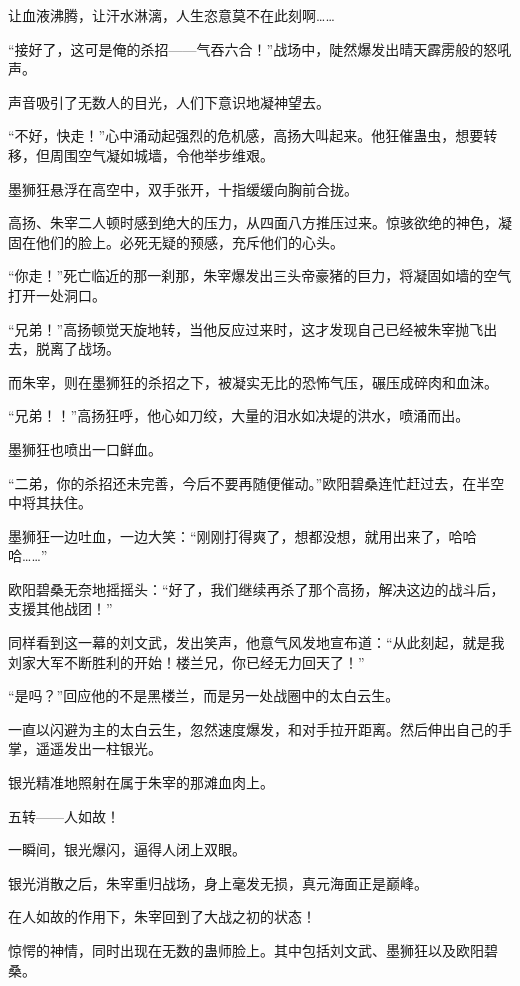 \begin{this_body}
让血液沸腾，让汗水淋漓，人生恣意莫不在此刻啊……

“接好了，这可是俺的杀招——气吞六合！”战场中，陡然爆发出晴天霹雳般的怒吼声。

声音吸引了无数人的目光，人们下意识地凝神望去。

“不好，快走！”心中涌动起强烈的危机感，高扬大叫起来。他狂催蛊虫，想要转移，但周围空气凝如城墙，令他举步维艰。

墨狮狂悬浮在高空中，双手张开，十指缓缓向胸前合拢。

高扬、朱宰二人顿时感到绝大的压力，从四面八方推压过来。惊骇欲绝的神色，凝固在他们的脸上。必死无疑的预感，充斥他们的心头。

“你走！”死亡临近的那一刹那，朱宰爆发出三头帝豪猪的巨力，将凝固如墙的空气打开一处洞口。

“兄弟！”高扬顿觉天旋地转，当他反应过来时，这才发现自己已经被朱宰抛飞出去，脱离了战场。

而朱宰，则在墨狮狂的杀招之下，被凝实无比的恐怖气压，碾压成碎肉和血沫。

“兄弟！！”高扬狂呼，他心如刀绞，大量的泪水如决堤的洪水，喷涌而出。

墨狮狂也喷出一口鲜血。

“二弟，你的杀招还未完善，今后不要再随便催动。”欧阳碧桑连忙赶过去，在半空中将其扶住。

墨狮狂一边吐血，一边大笑：“刚刚打得爽了，想都没想，就用出来了，哈哈哈……”

欧阳碧桑无奈地摇摇头：“好了，我们继续再杀了那个高扬，解决这边的战斗后，支援其他战团！”

同样看到这一幕的刘文武，发出笑声，他意气风发地宣布道：“从此刻起，就是我刘家大军不断胜利的开始！楼兰兄，你已经无力回天了！”

“是吗？”回应他的不是黑楼兰，而是另一处战圈中的太白云生。

一直以闪避为主的太白云生，忽然速度爆发，和对手拉开距离。然后伸出自己的手掌，遥遥发出一柱银光。

银光精准地照射在属于朱宰的那滩血肉上。

五转——人如故！

一瞬间，银光爆闪，逼得人闭上双眼。

银光消散之后，朱宰重归战场，身上毫发无损，真元海面正是巅峰。

在人如故的作用下，朱宰回到了大战之初的状态！

惊愕的神情，同时出现在无数的蛊师脸上。其中包括刘文武、墨狮狂以及欧阳碧桑。


\end{this_body}
